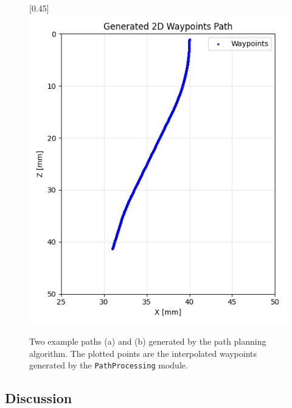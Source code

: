 \begin{figure}[H]
\begin{subcaptionbox}{\label{fig:right}}[0.45\linewidth]
        {\includegraphics[width=\linewidth]{images/waypoints/Figure_1.png}}
    \end{subcaptionbox}
    \caption{Two example paths (a) and (b) generated by the path planning algorithm. The plotted points are the interpolated waypoints generated by the \texttt{PathProcessing} module.}
    \label{fig:waypoints}
\end{figure}

\subsection{Discussion}
